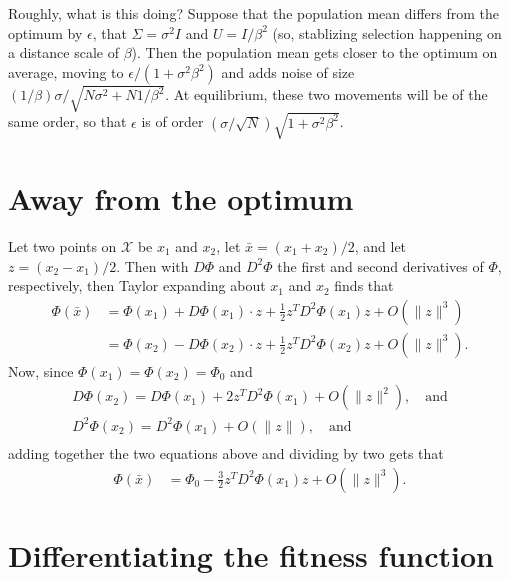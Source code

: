\documentclass{article}
\newcommand{\1}{\mathbbm{1}}
\newcommand{\optx}{\mathcal{X}}
\newcommand{\optph}{\Phi_0}
\begin{document}
Roughly, what is this doing?
Suppose that the population mean differs from the optimum by $\epsilon$,
that $\Sigma = \sigma^2 I$ and $U = I/\beta^2$ (so, stablizing selection happening on a distance scale of $\beta$).
Then the population mean gets closer to the optimum on average, moving to
$\epsilon/(1 + \sigma^2 \beta^2)$
and adds noise of size $(1/\beta) \sigma/\sqrt{N \sigma^2 + N 1/\beta^2}$.
At equilibrium, these two movements will be of the same order,
so that $\epsilon$ is of order $(\sigma/\sqrt{N}) \sqrt{1+\sigma^2 \beta^2}$.


\section{Away from the optimum}
\label{apx:away_from_opt}

Let two points  on $\optx$ be $x_1$ and $x_2$, let $\bar x = (x_1+x_2)/2$, and let $z=(x_2 - x_1)/2$.
Then with $D \Phi$ and $D^2 \Phi$ the first and second derivatives of $\Phi$, respectively,
then Taylor expanding about $x_1$ and $x_2$ finds that
\begin{align*}
    \Phi(\bar x) 
    &= \Phi(x_1) + D\Phi(x_1) \cdot z + \frac{1}{2} z^T D^2 \Phi(x_1) z + O(\|z\|^3) \\
    &= \Phi(x_2) - D\Phi(x_2) \cdot z + \frac{1}{2} z^T D^2 \Phi(x_2) z + O(\|z\|^3) .
\end{align*}
Now, since $\Phi(x_1) = \Phi(x_2) = \optph$ and
\begin{align*}
    D\Phi(x_2) = D\Phi(x_1) + 2 z^T D^2 \Phi(x_1) + O(\|z\|^2), \quad \text{and} \\
    D^2\Phi(x_2) = D^2\Phi(x_1) + O(\|z\|), \quad \text{and} \\
\end{align*}
adding together the two equations above and dividing by two gets that
\begin{align*}
    \Phi(\bar x) 
    &= \optph - \frac{3}{2} z^T D^2 \Phi(x_1) z + O(\|z\|^3) .
\end{align*}



\section{Differentiating the fitness function}
\label{apx:H_calc}
\end{document}
